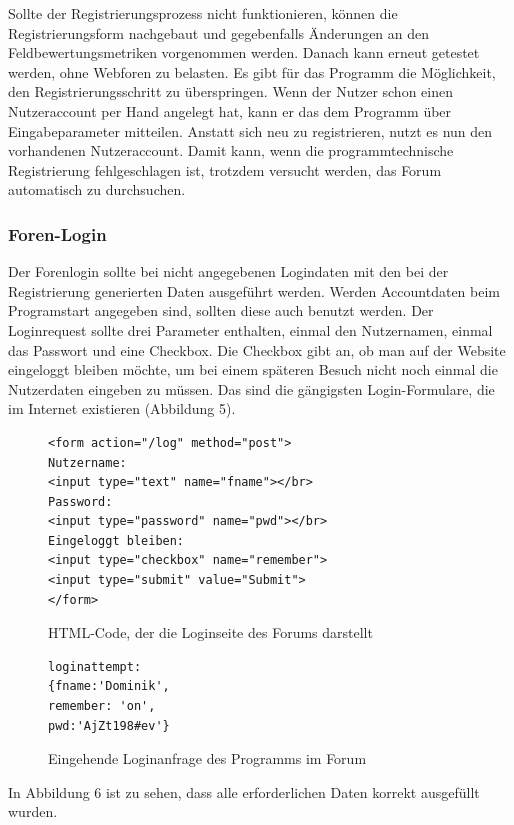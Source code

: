 Sollte der Registrierungsprozess nicht funktionieren, können die Registrierungsform nachgebaut und gegebenfalls Änderungen an den Feldbewertungsmetriken vorgenommen werden. Danach kann erneut getestet werden, ohne Webforen zu belasten. Es gibt für das Programm die Möglichkeit, den Registrierungsschritt zu überspringen. Wenn der Nutzer schon einen Nutzeraccount per Hand angelegt hat, kann er das dem Programm über Eingabeparameter mitteilen. Anstatt sich neu zu registrieren, nutzt es nun den vorhandenen Nutzeraccount. Damit kann, wenn die programmtechnische Registrierung fehlgeschlagen ist, trotzdem versucht werden, das Forum automatisch zu durchsuchen.

\subsubsection{Foren-Login}
Der Forenlogin sollte bei nicht angegebenen Logindaten mit den bei der Registrierung generierten Daten ausgeführt werden. Werden Accountdaten beim Programstart angegeben sind, sollten diese auch benutzt werden. Der Loginrequest sollte drei Parameter enthalten, einmal den Nutzernamen, einmal das Passwort und eine Checkbox. Die Checkbox gibt an, ob man auf der Website eingeloggt bleiben möchte, um bei einem späteren Besuch nicht noch einmal die Nutzerdaten eingeben zu müssen. Das sind die gängigsten Login-Formulare, die im Internet existieren (Abbildung 5).

\begin{figure}[ht]
\begin{lstlisting}[language=HTML5]
<form action="/log" method="post">
Nutzername: 
<input type="text" name="fname"></br>
Password: 
<input type="password" name="pwd"></br>
Eingeloggt bleiben: 
<input type="checkbox" name="remember">
<input type="submit" value="Submit">
</form>
\end{lstlisting}
\caption{HTML-Code, der die Loginseite des Forums darstellt}
\end{figure}


\begin{figure}[h!]
\begin{lstlisting}[language=HTML5]
loginattempt: 
{fname:'Dominik',
remember: 'on',
pwd:'AjZt198#ev'}
\end{lstlisting}
\caption{Eingehende Loginanfrage des Programms im Forum}
\end{figure}

In Abbildung 6 ist zu sehen, dass alle erforderlichen Daten korrekt ausgefüllt wurden.

